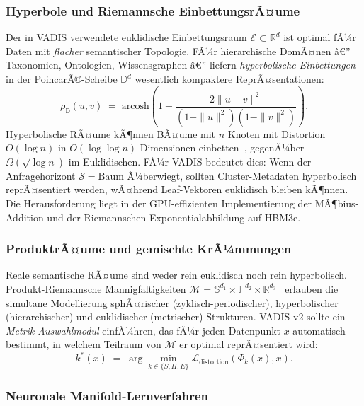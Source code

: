 ﻿\documentclass[12pt,a4paper]{article}
\begin{document}
\subsubsection{Hyperbole und Riemannsche EinbettungsrÃ¤ume}

Der in VADIS verwendete euklidische Einbettungsraum
$\mathcal{E} \subset \mathbb{R}^d$ ist optimal fÃ¼r
Daten mit \emph{flacher} semantischer Topologie. FÃ¼r
hierarchische DomÃ¤nen â€” Taxonomien, Ontologien, Wissensgraphen
â€” liefern \emph{hyperbolische Einbettungen}~\cite{nickel2017poincare}
in der PoincarÃ©-Scheibe $\mathbb{D}^d$ wesentlich kompaktere
ReprÃ¤sentationen:
\begin{equation}
  \rho_{\mathbb{D}}(u, v) \;=\; \text{arcosh}\!\left(
    1 + \frac{2\|u - v\|^2}{(1-\|u\|^2)(1-\|v\|^2)}
  \right).
\end{equation}
Hyperbolische RÃ¤ume kÃ¶nnen BÃ¤ume mit $n$ Knoten
mit Distortion $O(\log n)$ in $O(\log\log n)$
Dimensionen einbetten~\cite{sarkar2011lowdistortion},
gegenÃ¼ber $\Omega(\sqrt{\log n})$ im Euklidischen.
FÃ¼r VADIS bedeutet dies: Wenn der Anfragehorizont
$\mathcal{S} = \text{Baum}$ Ã¼berwiegt, sollten
Cluster-Metadaten hyperbolisch reprÃ¤sentiert werden,
wÃ¤hrend Leaf-Vektoren euklidisch bleiben kÃ¶nnen.
Die Herausforderung liegt in der GPU-effizienten
Implementierung der MÃ¶bius-Addition und der
Riemannschen Exponentialabbildung auf HBM3e.

\subsubsection{ProduktrÃ¤ume und gemischte KrÃ¼mmungen}

Reale semantische RÃ¤ume sind weder rein euklidisch
noch rein hyperbolisch. Produkt-Riemannsche Mannigfaltigkeiten
$\mathcal{M} = \mathbb{S}^{d_1} \times \mathbb{H}^{d_2}
\times \mathbb{R}^{d_3}$~\cite{gu2018learning}
erlauben die simultane Modellierung sphÃ¤rischer
(zyklisch-periodischer), hyperbolischer (hierarchischer)
und euklidischer (metrischer) Strukturen.
VADIS-v2 sollte ein \emph{Metrik-Auswahlmodul} einfÃ¼hren,
das fÃ¼r jeden Datenpunkt $x$ automatisch bestimmt,
in welchem Teilraum von $\mathcal{M}$ er optimal
reprÃ¤sentiert wird:
\begin{equation}
  k^*(x) \;=\; \arg\min_{k \in \{S, H, E\}}
    \mathcal{L}_{\text{distortion}}(\Phi_k(x), x).
\end{equation}

\subsubsection{Neuronale Manifold-Lernverfahren}
\end{document}
